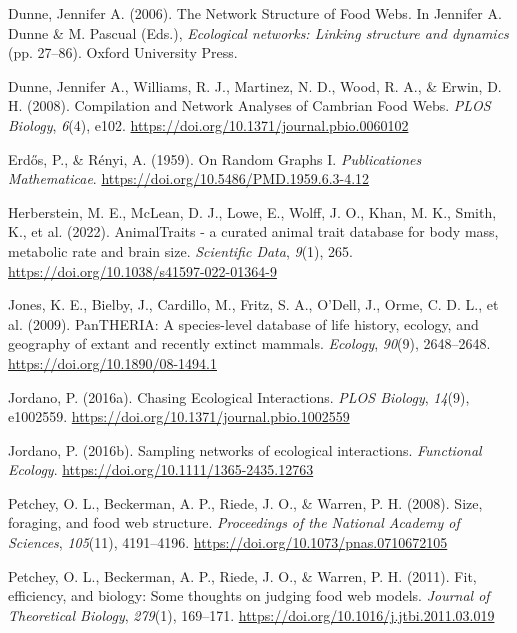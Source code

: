 \documentclass[
]{agujournal2019}
\newlength{\cslhangindent}
\newenvironment{CSLReferences}[2] %
 {\begin{list}{}{%
  \setlength{\itemindent}{0pt}
  \setlength{\leftmargin}{0pt}
  \setlength{\parsep}{0pt}
  \ifodd #1
   \setlength{\leftmargin}{\cslhangindent}
   \setlength{\itemindent}{-1\cslhangindent}
  \fi
  \setlength{\itemsep}{#2\baselineskip}}}
 {\end{list}}
\begin{document}
\begin{CSLReferences}{1}{0}
Dunne, Jennifer A. (2006). The {Network Structure} of {Food Webs}. In
Jennifer A. Dunne \& M. Pascual (Eds.), \emph{Ecological networks:
{Linking} structure and dynamics} (pp. 27--86). {Oxford University
Press}.

Dunne, Jennifer A., Williams, R. J., Martinez, N. D., Wood, R. A., \&
Erwin, D. H. (2008). Compilation and {Network Analyses} of {Cambrian
Food Webs}. \emph{PLOS Biology}, \emph{6}(4), e102.
\url{https://doi.org/10.1371/journal.pbio.0060102}

Erdős, P., \& Rényi, A. (1959). On {Random Graphs I}.
\emph{Publicationes Mathematicae}.
\url{https://doi.org/10.5486/PMD.1959.6.3-4.12}

Herberstein, M. E., McLean, D. J., Lowe, E., Wolff, J. O., Khan, M. K.,
Smith, K., et al. (2022). {AnimalTraits} - a curated animal trait
database for body mass, metabolic rate and brain size. \emph{Scientific
Data}, \emph{9}(1), 265.
\url{https://doi.org/10.1038/s41597-022-01364-9}

Jones, K. E., Bielby, J., Cardillo, M., Fritz, S. A., O'Dell, J., Orme,
C. D. L., et al. (2009). {PanTHERIA}: A species-level database of life
history, ecology, and geography of extant and recently extinct mammals.
\emph{Ecology}, \emph{90}(9), 2648--2648.
\url{https://doi.org/10.1890/08-1494.1}

Jordano, P. (2016a). Chasing {Ecological Interactions}. \emph{PLOS
Biology}, \emph{14}(9), e1002559.
\url{https://doi.org/10.1371/journal.pbio.1002559}

Jordano, P. (2016b). Sampling networks of ecological interactions.
\emph{Functional Ecology}. \url{https://doi.org/10.1111/1365-2435.12763}

Petchey, O. L., Beckerman, A. P., Riede, J. O., \& Warren, P. H. (2008).
Size, foraging, and food web structure. \emph{Proceedings of the
National Academy of Sciences}, \emph{105}(11), 4191--4196.
\url{https://doi.org/10.1073/pnas.0710672105}

Petchey, O. L., Beckerman, A. P., Riede, J. O., \& Warren, P. H. (2011).
Fit, efficiency, and biology: {Some} thoughts on judging food web
models. \emph{Journal of Theoretical Biology}, \emph{279}(1), 169--171.
\url{https://doi.org/10.1016/j.jtbi.2011.03.019}


\end{CSLReferences}
\end{document}
